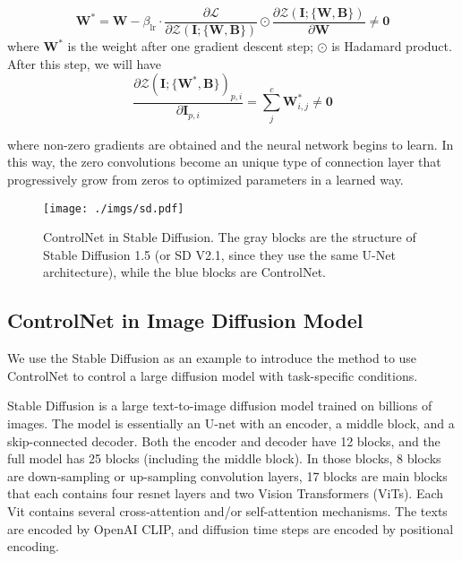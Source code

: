 \documentclass{article}
\begin{document}
\begin{equation}
\bm{W}^* = \bm{W} - \beta_{\text{lr}} \cdot \frac{\partial\mathcal{L}}{\partial\mathcal{Z}(\bm{I};\{\bm{W},\bm{B}\})} \odot \frac{\partial\mathcal{Z}(\bm{I};\{\bm{W},\bm{B}\})}{\partial\bm{W}} \neq \bm{0}
\end{equation}
where $\bm{W}^*$ is the weight after one gradient descent step; $\odot$ is Hadamard product. After this step, we will have
\begin{equation}
\frac{\partial\mathcal{Z}(\bm{I};\{\bm{W}^*,\bm{B}\})_{p,i}}{\partial\bm{I}_{p,i}} = \sum_{j}^c \bm{W}^*_{i,j} \neq \bm{0}
\end{equation}

where non-zero gradients are obtained and the neural network begins to learn. In this way, the zero convolutions become an unique type of connection layer that progressively grow from zeros to optimized parameters in a learned way.

\begin{figure}
	\centering
	\texttt{[image: ./imgs/sd.pdf]}
	\caption{ControlNet in Stable Diffusion. The gray blocks are the structure of Stable Diffusion 1.5 (or SD V2.1, since they use the same U-Net architecture), while the blue blocks are ControlNet.}
	\label{fig:hesd} 
\end{figure}

\subsection{ControlNet in Image Diffusion Model}
\label{hei}

We use the Stable Diffusion \cite{rombach2021highresolution} as an example to introduce the method to use ControlNet to control a large diffusion model with task-specific conditions.

Stable Diffusion is a large text-to-image diffusion model trained on billions of images. The model is essentially an U-net with an encoder, a middle block, and a skip-connected decoder. Both the encoder and decoder have 12 blocks, and the full model has 25 blocks (including the middle block). In those blocks, 8 blocks are down-sampling or up-sampling convolution layers, 17 blocks are main blocks that each contains four resnet layers and two Vision Transformers (ViTs). Each Vit contains several cross-attention and/or self-attention mechanisms. The texts are encoded by OpenAI CLIP, and diffusion time steps are encoded by positional encoding.
\end{document}
